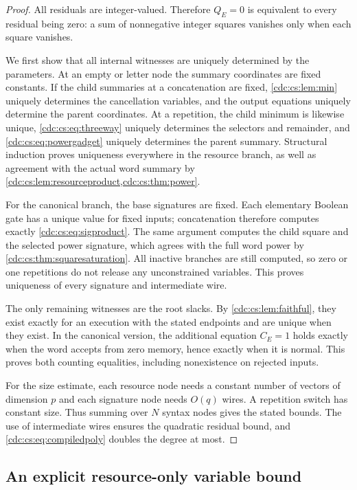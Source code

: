\documentclass[11pt,a4paper]{article}
\theoremstyle{definition}
\theoremstyle{remark}
\begin{document}
\begin{proof}
All residuals are integer-valued. Therefore $Q_E=0$ is equivalent to every
residual being zero: a sum of nonnegative integer squares vanishes only when
each square vanishes.

We first show that all internal witnesses are uniquely determined by the
parameters. At an empty or letter node the summary coordinates are fixed
constants. If the child summaries at a concatenation are fixed,
\cref{cdc:cs:lem:min} uniquely determines the cancellation variables, and the
output equations uniquely determine the parent coordinates. At a repetition,
the child minimum is likewise unique, \eqref{cdc:cs:eq:threeway} uniquely determines
the selectors and remainder, and \eqref{cdc:cs:eq:powergadget} uniquely determines
the parent summary. Structural induction proves uniqueness everywhere in the
resource branch, as well as agreement with the actual word summary by
\cref{cdc:cs:lem:resourceproduct,cdc:cs:thm:power}.

For the canonical branch, the base signatures are fixed. Each elementary
Boolean gate has a unique value for fixed inputs; concatenation therefore
computes exactly \eqref{cdc:cs:eq:sigproduct}. The same argument computes the child
square and the selected power signature, which agrees with the full word
power by \cref{cdc:cs:thm:squaresaturation}. All inactive branches are still
computed, so zero or one repetitions do not release any unconstrained
variables. This proves uniqueness of every signature and intermediate wire.

The only remaining witnesses are the root slacks. By
\cref{cdc:cs:lem:faithful}, they exist exactly for an execution with the stated
endpoints and are unique when they exist. In the canonical version, the
additional equation $C_E=1$ holds exactly when the word accepts from zero
memory, hence exactly when it is normal. This proves both counting equalities,
including nonexistence on rejected inputs.

For the size estimate, each resource node needs a constant number of vectors
of dimension $p$ and each signature node needs $O(q)$ wires. A repetition
switch has constant size. Thus summing over $N$ syntax nodes gives the stated
bounds. The use of intermediate wires ensures the quadratic residual bound,
and \eqref{cdc:cs:eq:compiledpoly} doubles the degree at most.
\end{proof}

\subsection{An explicit resource-only variable bound}
\end{document}
